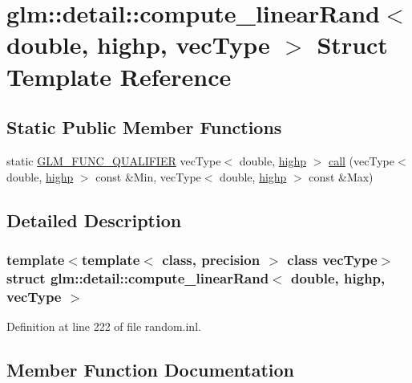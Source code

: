 \hypertarget{structglm_1_1detail_1_1compute__linear_rand_3_01double_00_01highp_00_01vec_type_01_4}{}\section{glm\+::detail\+::compute\+\_\+linear\+Rand$<$ double, highp, vec\+Type $>$ Struct Template Reference}
\label{structglm_1_1detail_1_1compute__linear_rand_3_01double_00_01highp_00_01vec_type_01_4}
\subsection*{Static Public Member Functions}
\begin{DoxyCompactItemize}
\item 
static \mbox{\hyperlink{setup_8hpp_a33fdea6f91c5f834105f7415e2a64407}{G\+L\+M\+\_\+\+F\+U\+N\+C\+\_\+\+Q\+U\+A\+L\+I\+F\+I\+ER}} vec\+Type$<$ double, \mbox{\hyperlink{namespaceglm_a0f04f086094c747d227af4425893f545ac6f7eab42eacbb10d59a58e95e362074}{highp}} $>$ \mbox{\hyperlink{structglm_1_1detail_1_1compute__linear_rand_3_01double_00_01highp_00_01vec_type_01_4_a2b6945aa0c510d768365896126a5017a}{call}} (vec\+Type$<$ double, \mbox{\hyperlink{namespaceglm_a0f04f086094c747d227af4425893f545ac6f7eab42eacbb10d59a58e95e362074}{highp}} $>$ const \&Min, vec\+Type$<$ double, \mbox{\hyperlink{namespaceglm_a0f04f086094c747d227af4425893f545ac6f7eab42eacbb10d59a58e95e362074}{highp}} $>$ const \&Max)
\end{DoxyCompactItemize}


\subsection{Detailed Description}
\subsubsection*{template$<$template$<$ class, precision $>$ class vec\+Type$>$\newline
struct glm\+::detail\+::compute\+\_\+linear\+Rand$<$ double, highp, vec\+Type $>$}



Definition at line 222 of file random.\+inl.



\subsection{Member Function Documentation}
\mbox{\label{structglm_1_1detail_1_1compute__linear_rand_3_01double_00_01highp_00_01vec_type_01_4_a2b6945aa0c510d768365896126a5017a}} 
